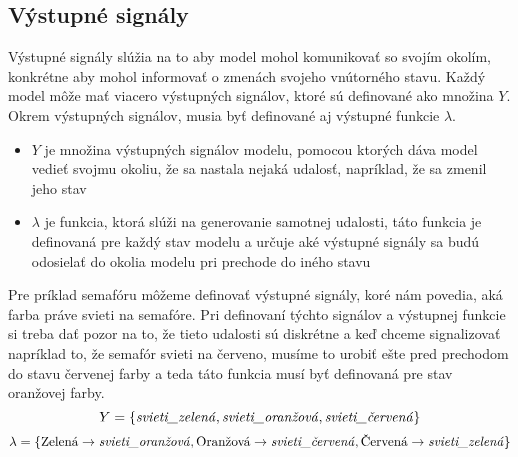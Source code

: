 \subsection*{Výstupné signály}
Výstupné signály slúžia na to aby model mohol komunikovať so svojím okolím, konkrétne aby mohol informovať o zmenách svojeho vnútorného stavu.
Každý model môže mať viacero výstupných signálov, ktoré sú definované ako množina $Y$.
Okrem výstupných signálov, musia byť definované aj výstupné funkcie $\lambda$.
\begin{itemize}
  \item $Y$ je množina výstupných signálov modelu, pomocou ktorých dáva model vedieť svojmu okoliu, že sa nastala nejaká udalosť, napríklad, že sa zmenil jeho stav
  \item $\lambda$ je funkcia, ktorá slúži na generovanie samotnej udalosti, táto funkcia je definovaná pre každý stav modelu a určuje aké výstupné signály sa budú odosielať do okolia modelu pri prechode do iného stavu
\end{itemize}
Pre príklad semafóru môžeme definovať výstupné signály, koré nám povedia, aká farba práve svieti na semafóre.
Pri definovaní týchto signálov a výstupnej funkcie si treba dať pozor na to, že tieto udalosti sú diskrétne a keď chceme signalizovať napríklad to, že semafór svieti na červeno, musíme to urobiť ešte pred prechodom do stavu červenej farby a teda táto funkcia musí byť definovaná pre stav oranžovej farby.
\[Y = \{\text{\textit{svieti\_zelená}}, \text{\textit{svieti\_oranžová}}, \text{\textit{svieti\_červená}} \}\]
\[\lambda = \{ \text{Zelená} \rightarrow \text{\textit{svieti\_oranžová}}, \text{Oranžová} \rightarrow \text{\textit{svieti\_červená}}, \text{Červená} \rightarrow \text{\textit{svieti\_zelená}} \}\]


